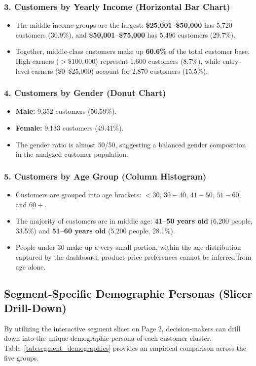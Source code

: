 \subsubsection{3. Customers by Yearly Income (Horizontal Bar Chart)}
\begin{itemize}
    \item The middle-income groups are the largest: \textbf{\$25,001--\$50,000} has 5,720 customers (30.9\%), and \textbf{\$50,001--\$75,000} has 5,496 customers (29.7\%).
    \item Together, middle-class customers make up \textbf{60.6\%} of the total customer base. High earners ($>\$100,000$) represent 1,600 customers (8.7\%), while entry-level earners (\$0--\$25,000) account for 2,870 customers (15.5\%).
\end{itemize}

\subsubsection{4. Customers by Gender (Donut Chart)}
\begin{itemize}
    \item \textbf{Male:} 9,352 customers (50.59\%).
    \item \textbf{Female:} 9,133 customers (49.41\%).
    \item The gender ratio is almost 50/50, suggesting a balanced gender composition in the analyzed customer population.
\end{itemize}

\subsubsection{5. Customers by Age Group (Column Histogram)}
\begin{itemize}
    \item Customers are grouped into age brackets: $<30$, $30-40$, $41-50$, $51-60$, and $60+$.
    \item The majority of customers are in middle age: \textbf{41--50 years old} (6,200 people, 33.5\%) and \textbf{51--60 years old} (5,200 people, 28.1\%).
    \item People under 30 make up a very small portion, within the age distribution captured by the dashboard; product-price preferences cannot be inferred from age alone.
\end{itemize}

\subsection{Segment-Specific Demographic Personas (Slicer Drill-Down)}
\label{subsec:bi_page2_personas}
By utilizing the interactive segment slicer on Page 2, decision-makers can drill down into the unique demographic persona of each customer cluster. Table~\ref{tab:segment_demographics} provides an empirical comparison across the five groups.

